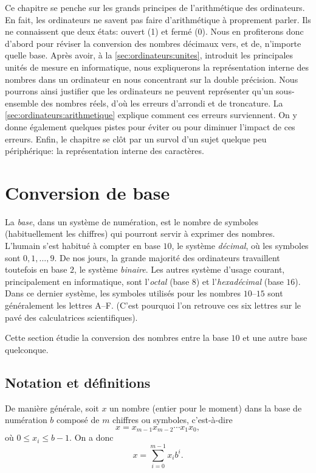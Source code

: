 \documentclass[letterpaper,11pt]{memoir}
\theoremstyle{plain}
\theoremstyle{definition}
\theoremstyle{remark}
\begin{document}
Ce chapitre se penche sur les grands principes de l'arithmétique des
ordinateurs. En fait, les ordinateurs ne savent pas faire
d'arithmétique à proprement parler. Ils ne connaissent que deux états:
ouvert (1) et fermé (0). Nous en profiterons donc d'abord pour réviser
la conversion des nombres décimaux vers, et de, n'importe quelle base.
Après avoir, à la \autoref{sec:ordinateurs:unites}, introduit les
principales unités de mesure en informatique, nous expliquerons la
représentation interne des nombres dans un ordinateur en nous
concentrant sur la double précision. Nous pourrons ainsi justifier que
les ordinateurs ne peuvent représenter qu'un sous-ensemble des nombres
réels, d'où les erreurs d'arrondi et de troncature. La
\autoref{sec:ordinateurs:arithmetique} explique comment ces erreurs
surviennent. On y donne également quelques pistes pour éviter ou pour
diminuer l'impact de ces erreurs. Enfin, le chapitre se clôt par un
survol d'un sujet quelque peu périphérique: la représentation interne
des caractères.


\section{Conversion de base}
\label{sec:ordinateurs:conversion}

La \emph{base}, dans un système de numération, est le nombre de
symboles (habituellement les chiffres) qui pourront servir à exprimer
des nombres. L'humain s'est habitué à compter en base $10$, le système
\emph{décimal}, où les symboles sont $0, 1, \dots, 9$. De nos jours,
la grande majorité des ordinateurs travaillent toutefois en base $2$, le
système \emph{binaire}. Les autres système d'usage courant,
principalement en informatique, sont l'\emph{octal} (base $8$) et
l'\emph{hexadécimal} (base $16$). Dans ce dernier système, les symboles
utilisés pour les nombres $10$--$15$ sont généralement les lettres A--F.
(C'est pourquoi l'on retrouve ces six lettres sur le pavé des
calculatrices scientifiques).

Cette section étudie la conversion des nombres entre la base $10$ et une
autre base quelconque.

\subsection{Notation et définitions}
\label{sec:ordinateurs:conversion:notation}

De manière générale, soit $x$ un nombre (entier pour le moment) dans
la base de numération $b$ composé de $m$ chiffres ou symboles, c'est-à-dire
\begin{equation*}
  x = x_{m-1}x_{m-2} \cdots x_1x_0,
\end{equation*}
où $0 \leq x_i \leq b - 1$. On a donc
\begin{equation}
  \label{eq:ordinateurs:def_base}
  x = \sum_{i = 0}^{m - 1} x_i b^i.
\end{equation}
\end{document}
